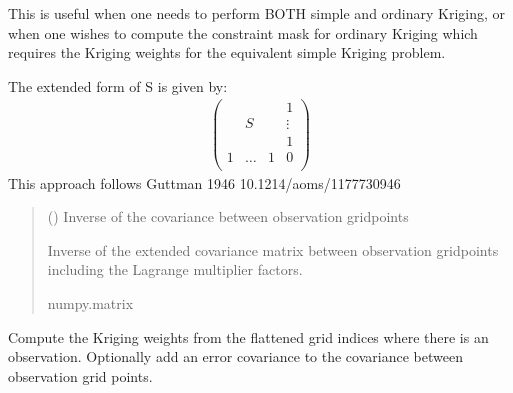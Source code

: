 \documentclass[letterpaper,10pt,english]{sphinxmanual}
\begin{document}
\begin{fulllineitems}
\begin{fulllineitems}
\sphinxAtStartPar
This is useful when one needs to perform BOTH simple and ordinary
Kriging, or when one wishes to compute the constraint mask for
ordinary Kriging which requires the Kriging weights for the equivalent
simple Kriging problem.

\sphinxAtStartPar
The extended form of S is given by:
\begin{equation*}
\begin{split}\begin{pmatrix}
&   & & 1 \\
& S & & \vdots \\
&   & & 1 \\
1 & \dots & 1 & 0 \\
\end{pmatrix}\end{split}
\end{equation*}
\sphinxAtStartPar
This approach follows Guttman 1946 10.1214/aoms/1177730946
\begin{quote}\begin{description}
\sphinxAtStartPar
{} () \textendash{} Inverse of the covariance between observation grid\sphinxhyphen{}points

\sphinxAtStartPar
Inverse of the extended covariance matrix between observation
grid\sphinxhyphen{}points including the Lagrange multiplier factors.

\sphinxAtStartPar
numpy.matrix

\end{description}\end{quote}

\end{fulllineitems}


\begin{fulllineitems}
\label{\detokenize{kriging:glomar_gridding.kriging.OrdinaryKriging.get_kriging_weights}}
\pysigstartsignatures
\pysiglinewithargsret
{}
{}
{}
\pysigstopsignatures
\sphinxAtStartPar
Compute the Kriging weights from the flattened grid indices where
there is an observation. Optionally add an error covariance to the
covariance between observation grid points.


\end{fulllineitems}
\end{fulllineitems}
\end{document}
